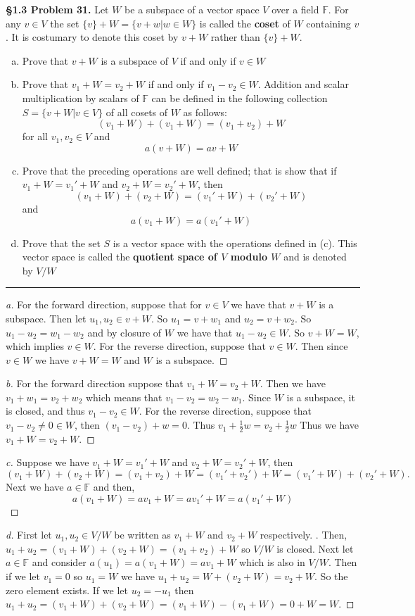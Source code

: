 \documentclass[leqno]{article}
\theoremstyle{nonumberplain}
\newtheorem{proof}{Proof}
\begin{document}
\noindent\textbf{\S 1.3 Problem 31.} Let $W$ be a subspace of a vector space $V$ over a field $\mathbb{F}$. For any $v\in V$ the set $\{v\}+W=\{v+w | w\in W\}$ is called the \textbf{coset} of $W$ containing $v$. It is costumary to denote this coset by $v+W$ rather than $\{v\} + W$.
\begin{enumerate}[(a)]
\item Prove that $v+W$ is a subspace of $V$ if and only if $v\in W$\\
\item Prove that $v_1 +W = v_2+W$ if and only if $v_1-v_2 \in W$.
Addition and scalar multiplication by scalars of $\mathbb{F}$ can be defined in the following collection $S=\{v+W |v\in V\}$ of all cosets of $W$ as follows:
\[(v_1+W)+(v_1+W)=(v_1+v_2)+W\]
for all $v_1,v_2\in V$ and
\[a(v+W)=av+W\]
\item Prove that the preceding operations are well defined; that is show that if $v_1+W=v_1'+W$ and $v_2+W=v_2'+W$, then 
\[(v_1+W)+(v_2+W)=(v_1'+W)+(v_2'+W)
\]
and
\[
a(v_1+W)=a(v_1'+W)
\]
\item Prove that the set $S$ is a vector space with the operations defined in (c).  This vector space is called the \textbf{quotient space of $V$ modulo $W$} and is denoted by $V/W$
\end{enumerate}

\noindent\rule[0.5ex]{\linewidth}{1pt}

\begin{proof}[a]
For the forward direction, suppose that for $v \in V$ we have that $v+W$ is a subspace.  Then let $u_1,u_2\in v+W$.  So $u_1=v+w_1$ and $u_2=v+w_2$.  So $u_1-u_2=w_1-w_2$ and by closure of $W$ we have that $u_1-u_2\in W$. So $v+W=W$, which implies $v\in W$. For the reverse direction, suppose that $v\in W$.  Then since $v\in W$ we have $v+W=W$ and $W$ is a subspace.
\end{proof}
\begin{proof}[b]
For the forward direction suppose that $v_1+W=v_2+W$.  Then we have $v_1+w_1=v_2+w_2$ which means that $v_1-v_2=w_2-w_1$.  Since $W$ is a subspace, it is closed, and thus $v_1-v_2\in W$.  For the reverse direction, suppose that $v_1-v_2\neq 0 \in W$, then $(v_1-v_2)+w=0$. Thus $v_1+\frac{1}{2}w=v_2+\frac{1}{2}w$ Thus we have $v_1+W=v_2+W$.
\end{proof}
\begin{proof}[c] Suppose we have $v_1+W=v_1'+W$ and $v_2+W=v_2'+W$, then 
\[(v_1+W)+(v_2+W)=(v_1+v_2)+W=(v_1'+v_2')+W=(v_1'+W)+(v_2'+W).\]
Next we have $a\in \mathbb{F}$ and then,
\[a(v_1+W)=av_1+W=av_1'+W=a(v_1'+W)\]
\end{proof}
\begin{proof}[d]
First let $u_1,u_2 \in V/W$ be written as $v_1+W$ and $v_2+W$ respectively. . Then, $u_1+u_2=(v_1+W)+(v_2+W)=(v_1+v_2)+W$ so $V/W$ is closed.  Next let $a\in \mathbb{F}$ and consider $a(u_1)=a(v_1+W)=av_1+W$ which is also in $V/W$.  Then if we let $v_1=0$ so $u_1=W$ we have $u_1+u_2=W+(v_2+W)=v_2+W$.  So the zero element exists.  If we let $u_2=-u_1$ then $u_1+u_2=(v_1 +W)+(v_2+W)=(v_1 +W)-(v_1+W)=0+W=W$.  
\end{proof}
\pagebreak
\end{document}

